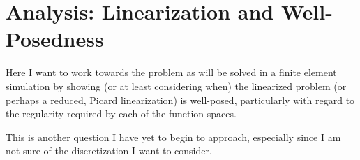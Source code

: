 \section{Analysis: Linearization and Well-Posedness}\label{cha:analysis}
    \begin{remark}
        Here I want to work towards the problem as will be solved in a finite element simulation by showing (or at least considering when) the linearized problem (or perhaps a reduced, Picard linearization) is well-posed, particularly with regard to the regularity required by each of the function spaces.
        
        This is another question I have yet to begin to approach, especially since I am not sure of the discretization I want to consider.
    \end{remark}
